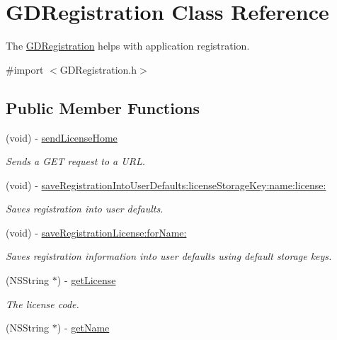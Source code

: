 \hypertarget{interface_g_d_registration}{
\section{GDRegistration Class Reference}
\label{interface_g_d_registration}
}


The \hyperlink{interface_g_d_registration}{GDRegistration} helps with application registration.  


{\ttfamily \#import $<$GDRegistration.h$>$}\subsection*{Public Member Functions}
\begin{DoxyCompactItemize}
\item 
(void) -\/ \hyperlink{interface_g_d_registration_a2aab3c30ff8931c4ce11159ecb3b830c}{sendLicenseHome}
\begin{DoxyCompactList}\small\item\em Sends a GET request to a URL. \item\end{DoxyCompactList}\item 
(void) -\/ \hyperlink{interface_g_d_registration_acc5044a15435a573919d7f6c68a70ff0}{saveRegistrationIntoUserDefaults:licenseStorageKey:name:license:}
\begin{DoxyCompactList}\small\item\em Saves registration into user defaults. \item\end{DoxyCompactList}\item 
(void) -\/ \hyperlink{interface_g_d_registration_a4ce808c5e052ea5080329c56b89df626}{saveRegistrationLicense:forName:}
\begin{DoxyCompactList}\small\item\em Saves registration information into user defaults using default storage keys. \item\end{DoxyCompactList}\item 
(NSString $\ast$) -\/ \hyperlink{interface_g_d_registration_ad8830b56a002a550f28c095233078aba}{getLicense}
\begin{DoxyCompactList}\small\item\em The license code. \item\end{DoxyCompactList}\item 
(NSString $\ast$) -\/ \hyperlink{interface_g_d_registration_a748a7113b6adcf0337c820aa56bb01ed}{getName}

\end{DoxyCompactItemize}
